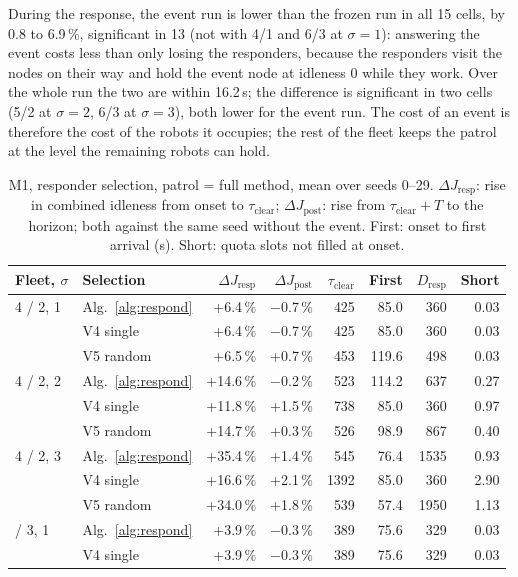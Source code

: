\documentclass[11pt]{article}
\theoremstyle{definition}
\theoremstyle{plain}
\begin{document}
During the response, the event run is lower than the frozen run in all 15
cells, by 0.8 to 6.9\,\%, significant in 13 (not with 4/1 and 6/3 at
$\sigma = 1$): answering the event costs less than only losing the
responders, because the responders visit the nodes on their way and hold
the event node at idleness 0 while they work. Over the whole run the two
are within 16.2\,s; the difference is significant in two cells (5/2 at
$\sigma = 2$, 6/3 at $\sigma = 3$), both lower for the event run. The cost
of an event is therefore the cost of the robots it occupies; the rest of
the fleet keeps the patrol at the level the remaining robots can hold.

\begin{table}[H]
\centering
\small
\caption{M1, responder selection, patrol = full method, mean over seeds 0--29. $\Delta J_{\mathrm{resp}}$: rise in combined idleness from onset to $\tau_{\mathrm{clear}}$; $\Delta J_{\mathrm{post}}$: rise from $\tau_{\mathrm{clear}} + T$ to the horizon; both against the same seed without the event. First: onset to first arrival (s). Short: quota slots not filled at onset.}
\label{tab:m1dispatch}
\begin{tabular}{llrrrrrr}
\toprule
Fleet, $\sigma$ & Selection & $\Delta J_{\mathrm{resp}}$ & $\Delta J_{\mathrm{post}}$ & $\tau_{\mathrm{clear}}$ & First & $D_{\mathrm{resp}}$ & Short \\
\midrule
4 / 2, 1 & Alg.~\ref{alg:respond} & +6.4\,\% & $-$0.7\,\% & 425 & 85.0 & 360 & 0.03 \\
 & V4 single & +6.4\,\% & $-$0.7\,\% & 425 & 85.0 & 360 & 0.03 \\
 & V5 random & +6.5\,\% & +0.7\,\% & 453 & 119.6 & 498 & 0.03 \\
4 / 2, 2 & Alg.~\ref{alg:respond} & +14.6\,\% & $-$0.2\,\% & 523 & 114.2 & 637 & 0.27 \\
 & V4 single & +11.8\,\% & +1.5\,\% & 738 & 85.0 & 360 & 0.97 \\
 & V5 random & +14.7\,\% & +0.3\,\% & 526 & 98.9 & 867 & 0.40 \\
4 / 2, 3 & Alg.~\ref{alg:respond} & +35.4\,\% & +1.4\,\% & 545 & 76.4 & 1535 & 0.93 \\
 & V4 single & +16.6\,\% & +2.1\,\% & 1392 & 85.0 & 360 & 2.90 \\
 & V5 random & +34.0\,\% & +1.8\,\% & 539 & 57.4 & 1950 & 1.13 \\
\addlinespace
6 / 3, 1 & Alg.~\ref{alg:respond} & +3.9\,\% & $-$0.3\,\% & 389 & 75.6 & 329 & 0.03 \\
 & V4 single & +3.9\,\% & $-$0.3\,\% & 389 & 75.6 & 329 & 0.03 \\

\end{tabular}
\end{table}
\end{document}
